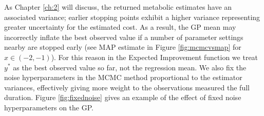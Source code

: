 As Chapter \ref{ch:2} will discuss, the returned metabolic estimates have an associated variance; earlier stopping points exhibit a higher variance representing greater uncertainty for the estimated cost. As a result, the GP mean may incorrectly inflate the best observed value if a number of parameter settings nearby are stopped early (see MAP estimate in Figure \ref{fig:mcmcvsmap} for $x\in(-2, -1)$). For this reason in the Expected Improvement function we treat $y^*$ as the best observed value so far, not the regression mean. We also fix the noise hyperparameters in the MCMC method proportional to the estimator variances, effectively giving more weight to the observations measured the full duration. Figure \ref{fig:fixednoise} gives an example of the effect of fixed noise hyperparameters on the GP.